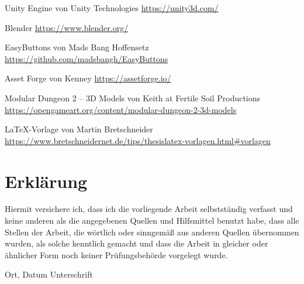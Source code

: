 Unity Engine von Unity Technologies
\newblock \url{https://unity3d.com/}

Blender
\newblock \url{https://www.blender.org/}

EasyButtons von Mads Bang Hoffensetz
\newblock \url{https://github.com/madsbangh/EasyButtons}

Asset Forge von Kenney
\newblock \url{https://assetforge.io/}

Modular Dungeon 2 -- 3D Models von Keith at Fertile Soil Productions \label{m.tuer}
\newblock \url{https://opengameart.org/content/modular-dungeon-2-3d-models}

\LaTeX -Vorlage von Martin Bretschneider 
\newblock \url{https://www.bretschneidernet.de/tips/thesislatex-vorlagen.html#vorlagen}




\chapter*{Erklärung}

Hiermit versichere ich, dass ich die vorliegende Arbeit selbstständig verfasst und keine anderen als die angegebenen Quellen und Hilfsmittel benutzt habe, dass alle Stellen der Arbeit, die wörtlich oder sinngemäß aus anderen Quellen übernommen wurden, als solche kenntlich gemacht und dass die Arbeit in gleicher oder ähnlicher Form noch keiner Prüfungsbehörde vorgelegt wurde.

\vspace{3cm}
Ort, Datum \hspace{5cm} Unterschrift \\

